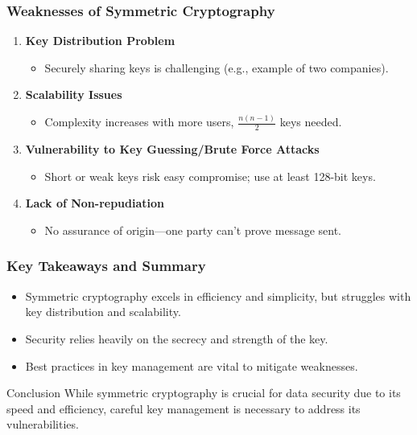 \documentclass{beamer}
\begin{document}
\begin{frame}[fragile]
    \frametitle{Weaknesses of Symmetric Cryptography}
    \begin{enumerate}
        \item \textbf{Key Distribution Problem}
        \begin{itemize}
            \item Securely sharing keys is challenging (e.g., example of two companies).
        \end{itemize}
        
        \item \textbf{Scalability Issues}
        \begin{itemize}
            \item Complexity increases with more users, \( \frac{n(n-1)}{2} \) keys needed.
        \end{itemize}
        
        \item \textbf{Vulnerability to Key Guessing/Brute Force Attacks}
        \begin{itemize}
            \item Short or weak keys risk easy compromise; use at least 128-bit keys.
        \end{itemize}
        
        \item \textbf{Lack of Non-repudiation}
        \begin{itemize}
            \item No assurance of origin—one party can't prove message sent.
        \end{itemize}
    \end{enumerate}
\end{frame}

\begin{frame}[fragile]
    \frametitle{Key Takeaways and Summary}
    \begin{itemize}
        \item Symmetric cryptography excels in efficiency and simplicity, but struggles with key distribution and scalability.
        \item Security relies heavily on the secrecy and strength of the key.
        \item Best practices in key management are vital to mitigate weaknesses.
    \end{itemize}
    
    \begin{block}{Conclusion}
        While symmetric cryptography is crucial for data security due to its speed and efficiency, careful key management is necessary to address its vulnerabilities.
    \end{block}
\end{frame}
\end{document}
